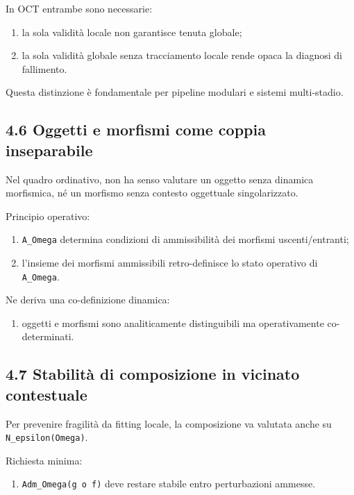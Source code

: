 In OCT entrambe sono necessarie:

\begin{enumerate}
\def\labelenumi{\arabic{enumi}.}
\tightlist
\item
  la sola validità locale non garantisce tenuta globale;
\item
  la sola validità globale senza tracciamento locale rende opaca la diagnosi di fallimento.
\end{enumerate}

Questa distinzione è fondamentale per pipeline modulari e sistemi multi-stadio.

\subsection{4.6 Oggetti e morfismi come coppia inseparabile}

Nel quadro ordinativo, non ha senso valutare un oggetto senza dinamica morfismica, né un morfismo senza contesto oggettuale singolarizzato.

Principio operativo:

\begin{enumerate}
\def\labelenumi{\arabic{enumi}.}
\tightlist
\item
  \texttt{A\_Omega} determina condizioni di ammissibilità dei morfismi uscenti/entranti;
\item
  l'insieme dei morfismi ammissibili retro-definisce lo stato operativo di \texttt{A\_Omega}.
\end{enumerate}

Ne deriva una co-definizione dinamica:

\begin{enumerate}
\def\labelenumi{\arabic{enumi}.}
\tightlist
\item
  oggetti e morfismi sono analiticamente distinguibili ma operativamente co-determinati.
\end{enumerate}

\subsection{4.7 Stabilità di composizione in vicinato contestuale}

Per prevenire fragilità da fitting locale, la composizione va valutata anche su \texttt{N\_epsilon(Omega)}.

Richiesta minima:

\begin{enumerate}
\def\labelenumi{\arabic{enumi}.}
\tightlist
\item
  \texttt{Adm\_Omega(g\ o\ f)} deve restare stabile entro perturbazioni ammesse.
\end{enumerate}

